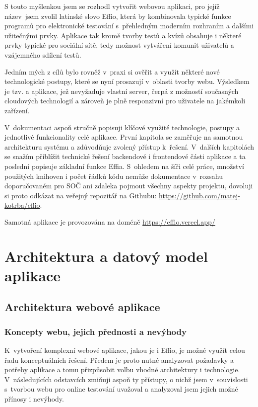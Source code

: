 \documentclass[12pt, a4paper,
openright
]{report}
\let\oldchapter\chapter
\renewcommand{\chapter}{
	\clearpage
	\pagestyle{fancy}
	\oldchapter
}
\begin{document}
S touto myšlenkou jsem se rozhodl vytvořit webovou aplikaci, pro jejíž název~jsem zvolil latinské slovo Effio, která by kombinovala typické funkce programů pro elektronické testování s~přehledným moderním rozhraním a dalšími užitečnými prvky. Aplikace tak kromě tvorby testů a kvízů obsahuje i některé prvky typické pro sociální sítě, tedy možnost vytváření komunit uživatelů a vzájemného sdílení testů. 

Jedním mých z cílů bylo rovněž v~praxi si ověřit a využít některé nové technologické postupy, které se nyní prosazují v~oblasti tvorby webu. Výsledkem je tzv. 
 a  aplikace, jež nevyžaduje vlastní server, čerpá z možností současných cloudových technologií a zároveň je plně responzivní pro uživatele na jakémkoli zařízení.

V~dokumentaci aspoň stručně popisuji klíčové využité technologie, postupy a jednotlivé funkcionality celé aplikace. První kapitola se zaměřuje na samotnou architekturu systému a zdůvodňuje zvolený přístup k~řešení. V~dalších kapitolách se snažím přiblížit technické řešení backendové i frontendové části aplikace a ta poslední popisuje základní funkce Effia. S~ohledem na šíři celé práce, množství použitých knihoven i počet řádků kódu nemůže dokumentace v~rozsahu doporučovaném pro SOČ ani zdaleka pojmout všechny aspekty projektu, dovoluji si proto odkázat na veřejný repozitář na Githubu: \url{https://github.com/matej-kotrba/effio}.

Samotná aplikace je provozována na doméně \url{https://effio.vercel.app/}



\chapter{Architektura a datový model aplikace}

\section{Architektura webové aplikace}

\subsection{Koncepty webu, jejich přednosti a nevýhody}
K~vytvoření komplexní webové aplikace, jakou je i Effio, je možné využít celou řadu konceptuálních řešení. Předem je proto nutné analyzovat požadavky a potřeby aplikace a tomu přizpůsobit volbu vhodné architektury i technologie. V~následujících odstavcích zmiňuji aspoň ty přístupy, o nichž jsem v~souvislosti s~tvorbou webu pro online testování uvažoval a analyzoval jsem jejich možné přínosy i nevýhody.
\end{document}

